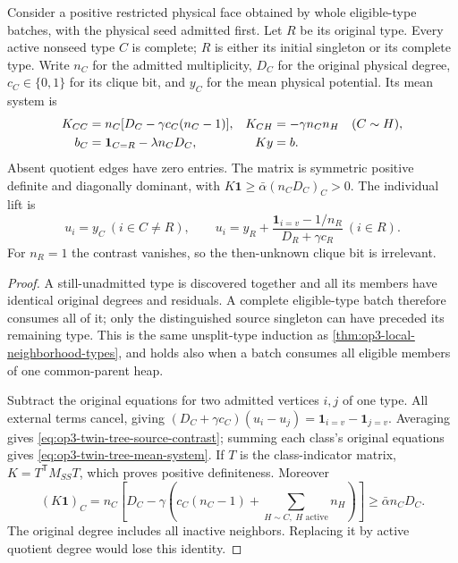 \begin{lemma}
\label{lem:op3-twin-tree-means}
Consider a positive restricted physical face obtained by whole eligible-type
batches, with the physical seed admitted first. Let $R$ be its original
type. Every active nonseed type $C$ is complete; $R$ is either its initial
singleton or its complete type. Write $n_C$ for the admitted multiplicity,
$D_C$ for the original physical degree, $c_C\in\{0,1\}$ for its clique
bit, and $y_C$ for the mean physical potential. Its mean system is
\begin{align}
 K_{CC}&=n_C[D_C-\gamma c_C(n_C-1)], &
 K_{CH}&=-\gamma n_Cn_H\quad(C\sim H),\notag\\
 b_C&=\boldsymbol1_{C=R}-\lambda n_CD_C,& Ky&=b.
 \label{eq:op3-twin-tree-mean-system}
\end{align}
Absent quotient edges have zero entries. The matrix is symmetric positive
definite and diagonally dominant, with
$K\boldsymbol1\geq\bar\alpha(n_CD_C)_C>0$. The individual lift is
\begin{equation}
 u_i=y_C\ (i\in C\ne R),\qquad
 u_i=y_R+\frac{\boldsymbol1_{i=v}-1/n_R}{D_R+\gamma c_R}
       \ (i\in R).
 \label{eq:op3-twin-tree-source-contrast}
\end{equation}
For $n_R=1$ the contrast vanishes, so the then-unknown clique bit is irrelevant.
\end{lemma}
\begin{proof}
A still-unadmitted type is discovered together and all its members have
identical original degrees and residuals. A complete eligible-type batch
therefore consumes all of it; only the distinguished source singleton can
have preceded its remaining type. This is the same unsplit-type induction
as \cref{thm:op3-local-neighborhood-types}, and holds also when a batch
consumes all eligible members of one common-parent heap.

Subtract the original equations for two admitted vertices $i,j$ of one
type. All external terms cancel, giving
$(D_C+\gamma c_C)(u_i-u_j)=\boldsymbol1_{i=v}-\boldsymbol1_{j=v}$.
Averaging gives \eqref{eq:op3-twin-tree-source-contrast}; summing each
class's original equations gives \eqref{eq:op3-twin-tree-mean-system}.
If $T$ is the class-indicator matrix, $K=T^{\mathsf T}M_{SS}T$, which
proves positive definiteness. Moreover
\[
 (K\boldsymbol1)_C
 =n_C\left[D_C-\gamma\left(c_C(n_C-1)+
                   \sum_{H\sim C,\ H\text{ active}}n_H\right)\right]
 \geq\bar\alpha n_CD_C.
\]
The original degree includes all inactive neighbors. Replacing it by
active quotient degree would lose this identity.
\end{proof}

